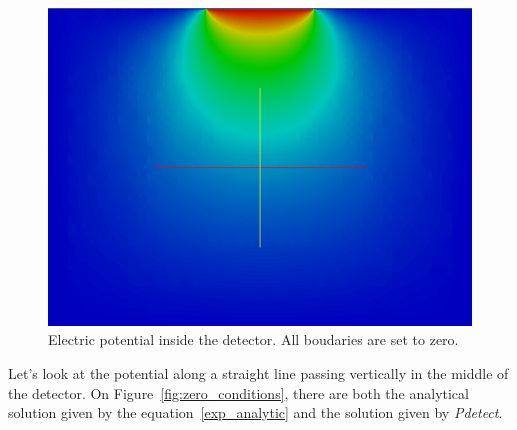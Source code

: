 \documentclass[11pt]{article}
\begin{document}
			\begin{figure}[H]
				\center
				\includegraphics[scale=0.4]{images/boundary_conditions/detector/w_zero_conditions.png}
				\caption{Electric potential inside the detector. All boudaries are set to zero.}
				\label{fig:w_zero_conditions}
			\end{figure}

			Let's look at the potential along a straight line passing vertically in the middle of
			the detector. On Figure~\ref{fig:zero_conditions}, there are both the analytical solution
			given by the equation~\ref{exp_analytic} and the solution given by \textit{Pdetect}.
\end{document}
